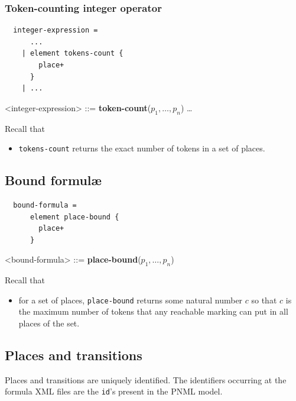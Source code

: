 \documentclass[10pt,english,a4paper]{article}
\newcommand\set[1]           {{\{ #1 \mathclose \}}}
\newcommand\N                {\mathbb{N}}
\newcommand\atomplacebnd[1]  {\textbf{place-bound}(#1)}
\newcommand\atomtokenscnt[1] {\textbf{token-count}(#1)}
\newcommand\mysubsection[1]{\color{sectioncolor}\subsection{#1}\color{defaultcolor}}
\begin{document}
\subsubsection{Token-counting integer operator}

\begin{multicols}{2}
\begin{lstlisting}
  integer-expression =
      ...
    | element tokens-count {
        place+
      }
    | ...
\end{lstlisting}
\columnbreak
\begin{grammar}
<integer-expression> ::=
     \atomtokenscnt{$p_1, \ldots, p_n$}
\alt \ldots
\end{grammar}
\end{multicols}

Recall that
\begin{itemize}
  \item \lstinline!tokens-count! returns the exact number of tokens in a set of places.
\end{itemize}

\mysubsection{Bound formulæ}

\begin{multicols}{2}
\begin{lstlisting}
  bound-formula =
      element place-bound {
        place+
      }
\end{lstlisting}
\columnbreak
\begin{grammar}
<bound-formula> ::=
     \atomplacebnd{$p_1, \ldots, p_n$}
\end{grammar}
\end{multicols}

Recall that
\begin{itemize}
\item for a set of places, \lstinline!place-bound! returns some
natural number $c$ so that $c$ is the maximum number of tokens that any reachable marking can put in all places of the set.
\end{itemize}

\mysubsection{Places and transitions}

Places and transitions are uniquely identified. The identifiers occurring at
the formula XML files are the \texttt{id}'s present in the PNML model.
\end{document}
